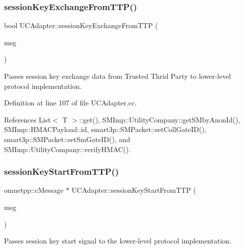 \mbox{\label{classUCAdapter_a98ef8576af7f724b687edcf2dc7c3221}} 
\subsubsection{\texorpdfstring{session\+Key\+Exchange\+From\+T\+T\+P()}{sessionKeyExchangeFromTTP()}}
{\footnotesize\ttfamily bool U\+C\+Adapter\+::session\+Key\+Exchange\+From\+T\+TP (\begin{DoxyParamCaption}\item[{omnetpp\+::c\+Message $\ast$}]{msg }\end{DoxyParamCaption})}

Passes session key exchange data from Trusted Thrid Party to lower-\/level protocol implementation. 

Definition at line 107 of file U\+C\+Adapter.\+cc.



References List$<$ T $>$\+::get(), S\+M\+Imp\+::\+Utility\+Company\+::get\+S\+Mby\+Anon\+Id(), S\+M\+Imp\+::\+H\+M\+A\+C\+Payload\+::id, smart3p\+::\+S\+M\+Packet\+::set\+Coll\+Gate\+I\+D(), smart3p\+::\+S\+M\+Packet\+::set\+Sm\+Gate\+I\+D(), and S\+M\+Imp\+::\+Utility\+Company\+::verify\+H\+M\+A\+C().

\mbox{\label{classUCAdapter_a5d19454ec8881addda7d1f144cae56eb}} 
\subsubsection{\texorpdfstring{session\+Key\+Start\+From\+T\+T\+P()}{sessionKeyStartFromTTP()}}
{\footnotesize\ttfamily omnetpp\+::c\+Message $\ast$ U\+C\+Adapter\+::session\+Key\+Start\+From\+T\+TP (\begin{DoxyParamCaption}\item[{omnetpp\+::c\+Message $\ast$}]{msg }\end{DoxyParamCaption})}

Passes session key start signal to the lower-\/level protocol implementation. 

